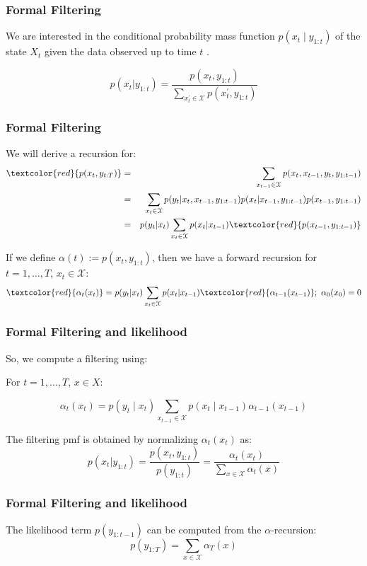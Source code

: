 \documentclass[xcolor=dvipsnames, compress]{beamer}
\begin{document}
\begin{frame}
\frametitle{Formal Filtering}
We are interested in the conditional probability mass function $p\left(x_{t}\mid y_{1:t}\right)$ of the state $X_{t}$ given the data observed up to time $t$ .

$$ p(x_t|y_{1:t}) = \frac{p(x_t, y_{1:t})}{ \sum_{x_t^\prime \in \mathcal{X}} p(x_t^\prime, y_{1:t}) }$$

\end{frame}
%
\begin{frame}
\frametitle{Formal Filtering}
We will derive a recursion for:
\hspace{-0.2cm}
\begin{eqnarray*}
\textcolor{red}{p(x_t,y_{t	:T})} & = & \sum_{x_{t-1} \in \mathcal{X}} p(x_t, x_{t-1}, y_t, y_{1:t-1})\\
& = & \sum_{x_t \in \mathcal{X}} p(y_{t}| x_t, x_{t-1}, y_{1:t-1} ) p(x_{t} |x_{t-1},y_{1:t-1}) p(x_{t-1},y_{1:t-1}) \\
& = &  p(y_{t}|x_t) \sum_{x_t \in \mathcal{X}} p(x_{t}|x_{t-1}) \textcolor{red}{ p(x_{t-1},y_{1:t-1})}   
\end{eqnarray*}

If we define $\alpha(t):= p(x_{t},y_{1:t})$, then we have a forward recursion for $t=1, \ldots, T$, $x_t\in \mathcal{X}$:
$$ \textcolor{red}{\alpha_{t}(x_{t})} = p(y_{t}|x_t) \sum_{x_t \in \mathcal{X}} p(x_{t}|x_{t-1}) \textcolor{red}{\alpha_{t-1}(x_{t-1})}; \mbox{ } \alpha_0(x_0)=0 $$
\end{frame}
%
\begin{frame}
\frametitle{Formal Filtering and likelihood}
So, we compute a filtering using: 

For $t=1,\ldots,T$, $x\in X$:

\[
\alpha_{t}\left(x_{t}\right)=p\left(y_{t}\mid x_{t}\right)\sum_{x_{t-1}\in\mathcal{{X}}}p\left(x_{t}\mid x_{t-1}\right)\alpha_{t-1}\left(x_{t-1}\right)
\]	

The filtering pmf is obtained by normalizing $\alpha_{t}\left(x_{t}\right)$
as: 
$$p(x_t| y_{1:t}) = \frac{p(x_t, y_{1:t})}{p(y_{1:t})}  = \frac{\alpha_t(x_t)}{ \sum_{x \in \mathcal{X}} \alpha_t(x) }$$
\end{frame}
%
\begin{frame}
\frametitle{Formal Filtering and likelihood}


The likelihood term $p\left(y_{1:t-1}\right)$ can be computed from
the $\alpha$-recursion:
$$p(y_{1:T}) =  \sum_{x \in \mathcal{X}} \alpha_T(x) $$

\end{frame}
\end{document}
